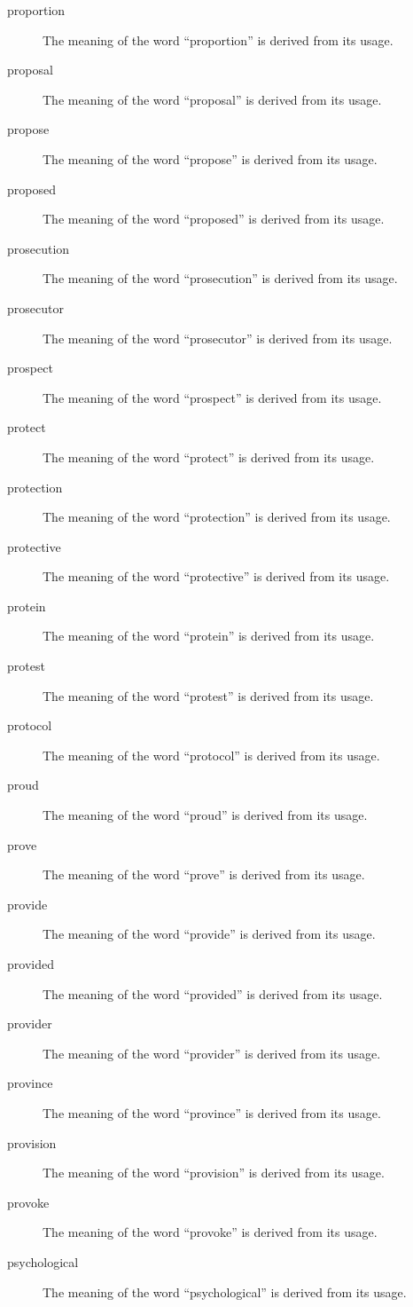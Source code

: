 \documentclass[12pt, letterpaper]{memoir}
\begin{document}
\begin{description}
\item[proportion] The meaning of the word ``proportion'' is derived from its usage.
\item[proposal] The meaning of the word ``proposal'' is derived from its usage.
\item[propose] The meaning of the word ``propose'' is derived from its usage.
\item[proposed] The meaning of the word ``proposed'' is derived from its usage.
\item[prosecution] The meaning of the word ``prosecution'' is derived from its usage.
\item[prosecutor] The meaning of the word ``prosecutor'' is derived from its usage.
\item[prospect] The meaning of the word ``prospect'' is derived from its usage.
\item[protect] The meaning of the word ``protect'' is derived from its usage.
\item[protection] The meaning of the word ``protection'' is derived from its usage.
\item[protective] The meaning of the word ``protective'' is derived from its usage.
\item[protein] The meaning of the word ``protein'' is derived from its usage.
\item[protest] The meaning of the word ``protest'' is derived from its usage.
\item[protocol] The meaning of the word ``protocol'' is derived from its usage.
\item[proud] The meaning of the word ``proud'' is derived from its usage.
\item[prove] The meaning of the word ``prove'' is derived from its usage.
\item[provide] The meaning of the word ``provide'' is derived from its usage.
\item[provided] The meaning of the word ``provided'' is derived from its usage.
\item[provider] The meaning of the word ``provider'' is derived from its usage.
\item[province] The meaning of the word ``province'' is derived from its usage.
\item[provision] The meaning of the word ``provision'' is derived from its usage.
\item[provoke] The meaning of the word ``provoke'' is derived from its usage.
\item[psychological] The meaning of the word ``psychological'' is derived from its usage.

\end{description}
\end{document}
